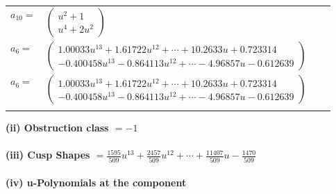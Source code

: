 \documentclass[1p]{elsarticle_modified}
\theoremstyle{definition}
\begin{document}
\begin{tabular}{m{7pt} m{180pt} m{7pt} m{180pt} }
\flushright $a_{10}=$&$\begin{pmatrix}u^2+1\\u^4+2 u^2\end{pmatrix}$ \\
\flushright $a_{6}=$&$\begin{pmatrix}1.00033 u^{13}+1.61722 u^{12}+\cdots+10.2633 u+0.723314\\-0.400458 u^{13}-0.864113 u^{12}+\cdots-4.96857 u-0.612639\end{pmatrix}$\\ \flushright $a_{6}=$&$\begin{pmatrix}1.00033 u^{13}+1.61722 u^{12}+\cdots+10.2633 u+0.723314\\-0.400458 u^{13}-0.864113 u^{12}+\cdots-4.96857 u-0.612639\end{pmatrix}$\\&\end{tabular}
\flushleft \textbf{(ii) Obstruction class $= -1$}\\~\\
\flushleft \textbf{(iii) Cusp Shapes $= \frac{1595}{509} u^{13}+\frac{2457}{509} u^{12}+\cdots+\frac{11407}{509} u-\frac{1470}{509}$}\\~\\
\newpage\renewcommand{\arraystretch}{1}
\flushleft \textbf{(iv) u-Polynomials at the component}\newline \\
\end{document}
